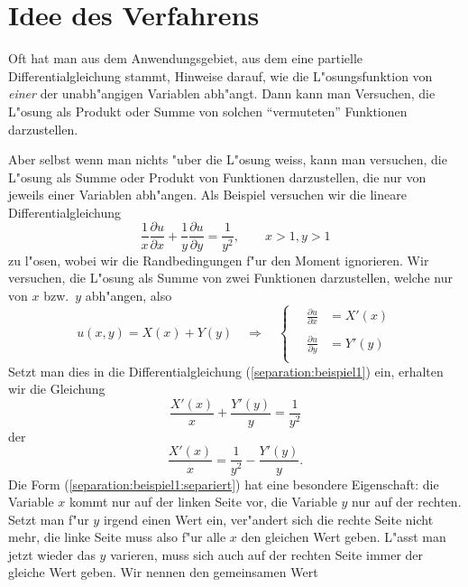\section{Idee des Verfahrens}
Oft hat man aus dem Anwendungsgebiet, aus dem eine partielle
Differentialgleichung stammt, Hinweise darauf, wie die L"osungsfunktion
von {\em einer} der unabh"angigen Variablen abh"angt.
Dann kann man Versuchen, die L"osung als Produkt oder Summe von
solchen ``vermuteten'' Funktionen darzustellen.

Aber selbst wenn man nichts "uber die L"osung weiss, kann man 
versuchen, die L"osung als Summe oder Produkt von Funktionen darzustellen,
die nur von jeweils einer Variablen abh"angen. Als Beispiel versuchen
wir die lineare Differentialgleichung 
\begin{equation}
\frac1x
\frac{\partial u}{\partial x}
+
\frac1y
\frac{\partial u}{\partial y}
=\frac1{y^2}
,
\qquad x>1, y>1
\label{separation:beispiel1}
\end{equation}
zu l"osen, wobei wir die Randbedingungen f"ur den Moment ignorieren.
Wir versuchen, die L"osung als Summe von zwei Funktionen darzustellen,
welche nur von $x$ bzw.~$y$ abh"angen, also
\begin{equation}
u(x,y)=X(x)+Y(y)
\quad\Rightarrow\quad
\begin{cases}
\quad{\displaystyle \frac{\partial u}{\partial x}}&=X'(x)\\
\\
\quad{\displaystyle \frac{\partial u}{\partial y}}&=Y'(y)\\
\end{cases}
\label{separation:beispiel1:ansatz}
\end{equation}
Setzt man dies in die Differentialgleichung (\ref{separation:beispiel1})
ein, erhalten wir die Gleichung
\[
\frac{X'(x)}{x}+\frac{Y'(y)}{y}=\frac1{y^2}
\]
der
\begin{equation}
\frac{X'(x)}{x}
=\frac1{y^2}
-\frac{Y'(y)}{y}.
\label{separation:beispiel1:separiert}
\end{equation}
Die Form (\ref{separation:beispiel1:separiert}) hat eine besondere
Eigenschaft: die Variable $x$ kommt nur auf der linken Seite vor,
die Variable $y$ nur auf der rechten. Setzt man f"ur $y$ irgend
einen Wert ein, ver"andert sich die rechte Seite nicht mehr,
die linke Seite muss also f"ur alle $x$ den gleichen Wert geben.
L"asst man jetzt wieder das $y$ varieren, muss sich auch auf der rechten
Seite immer der gleiche Wert geben. Wir nennen den gemeinsamen Wert
